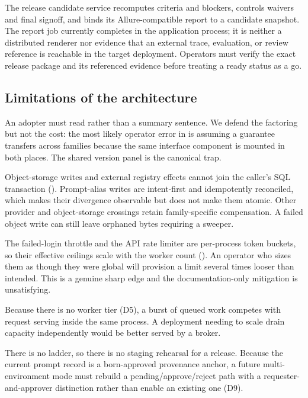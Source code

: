  The release
candidate service recomputes criteria and blockers, controls waivers and final
signoff, and binds its Allure-compatible report to a candidate snapshot.  The
report job currently completes in the application process; it is neither a
distributed renderer nor evidence that an external trace, evaluation, or review
reference is reachable in the target deployment.  Operators must verify the exact
release package and its referenced evidence before treating a ready status as a go.

\subsection{Limitations of the architecture}

 An adopter must read
 rather than a summary sentence. We defend the factoring but
not the cost: the most likely operator error in \sys is assuming a guarantee
transfers across families because the same interface component is mounted in both
places. The shared version panel is the canonical trap.

 Object-storage writes and
external registry effects cannot join the caller's SQL transaction
(). Prompt-alias writes are intent-first and idempotently
reconciled, which makes their divergence observable but does not make them atomic.
Other provider and object-storage crossings retain family-specific compensation. A
failed object write can still leave orphaned bytes requiring a sweeper.

 The failed-login throttle and the API rate
limiter are per-process token buckets, so their effective ceilings scale with the
worker count (). An operator who sizes them as though they were
global will provision a limit several times looser than intended. This is a genuine
sharp edge and the documentation-only mitigation is unsatisfying.

 Because there is no worker tier
(D5), a burst of queued work competes with request serving inside the same process.
A deployment needing to scale drain capacity independently would be better served by
a broker.

 There is no
\arrowto{}\arrowto{} ladder, so there is no staging
rehearsal for a release. Because the current prompt record is a born-approved
provenance anchor, a future multi-environment mode must rebuild a
pending/approve/reject path with a requester-and-approver distinction rather than
enable an existing one (D9).

